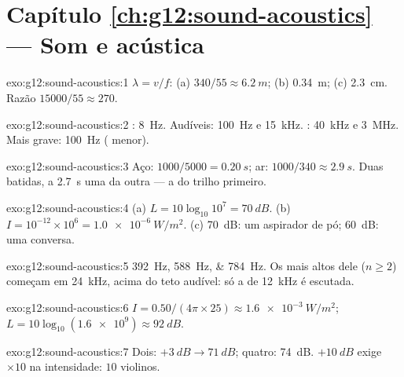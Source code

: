 \section*{Capítulo \ref{ch:g12:sound-acoustics} --- Som e acústica}

\begin{solution}{exo:g12:sound-acoustics:1}
$\lambda = v/f$: (a) $340/55 \approx \qty{6.2}{m}$; (b) \qty{0.34}{m};
(c) \qty{2.3}{cm}. Razão $15000/55 \approx 270$.
\end{solution}

\begin{solution}{exo:g12:sound-acoustics:2}
: \qty{8}{Hz}. Audíveis: \qty{100}{Hz} e \qty{15}{kHz}.
: \qty{40}{kHz} e \qty{3}{MHz}. Mais grave: \qty{100}{Hz}
( menor).
\end{solution}

\begin{solution}{exo:g12:sound-acoustics:3}
Aço: $1000/5000 = \qty{0.20}{s}$; ar:
$1000/340 \approx \qty{2.9}{s}$. Duas batidas, a \qty{2.7}{s} uma da
outra --- a do trilho primeiro.
\end{solution}

\begin{solution}{exo:g12:sound-acoustics:4}
(a) $L = 10\log_{10}10^{7} = \qty{70}{dB}$. (b)
$I = 10^{-12} \times 10^{6} = \qty{1.0e-6}{W/m^2}$. (c) \qty{70}{dB}: um
aspirador de pó; \qty{60}{dB}: uma conversa.
\end{solution}

\begin{solution}{exo:g12:sound-acoustics:5}
\qtylist{392;588;784}{Hz}. Os  mais altos dele ($n \ge 2$)
começam em \qty{24}{kHz}, acima do teto audível: só a  de
\qty{12}{kHz} é escutada.
\end{solution}

\begin{solution}{exo:g12:sound-acoustics:6}
$I = 0.50/(4\pi \times 25) \approx \qty{1.6e-3}{W/m^2}$;
$L = 10\log_{10}(\num{1.6e9}) \approx \qty{92}{dB}$.
\end{solution}

\begin{solution}{exo:g12:sound-acoustics:7}
Dois: $+\qty{3}{dB} \to \qty{71}{dB}$; quatro: \qty{74}{dB}.
$+\qty{10}{dB}$ exige $\times 10$ na intensidade: $10$ violinos.
\end{solution}

